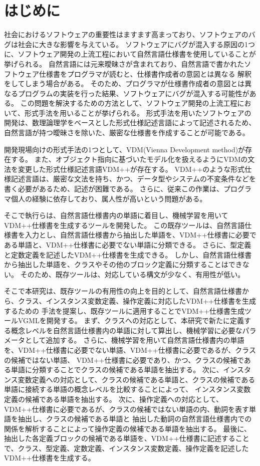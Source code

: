 \chapter{はじめに}
\label{cha:Introduction}

社会におけるソフトウェアの重要性はますます高まっており、ソフトウェアのバグは社会に大きな影響を与えている\cite{}。
ソフトウェアにバグが混入する原因の1つに、ソフトウェア開発の上流工程において自然言語仕様書を使用していることが挙げられる。
自然言語には元来曖昧さが含まれており、自然言語で書かれたソフトウェア仕様書をプログラマが読むと、仕様書作成者の意図とは異なる
解釈をしてしまう場合がある。
そのため、プログラマが仕様書作成者の意図とは異なるプログラムの実装を行った結果、ソフトウェアにバグが混入する可能性がある。
この問題を解決するための方法として、ソフトウェア開発の上流工程において、形式手法を用いることが挙げられる。
形式手法を用いたソフトウェアの開発は、数理論理学をベースとした形式仕様記述言語によって記述されるため、
自然言語が持つ曖昧さを除いた、厳密な仕様書を作成することが可能である。

開発現場向けの形式手法の1つとして、VDM(Vienna Development method)\cite{}が存在する。
また、オブジェクト指向に基づいたモデル化を扱えるようにVDMの文法を変更した形式仕様記述言語VDM++が存在する。
VDM++のような形式仕様記述言語は、厳密な文法を持ち、かつ、データ型やシステムの不変条件などを書く必要があるため、記述が困難である。
さらに、従来この作業は、プログラマ個人の経験に依存しており、属人性が高いという問題がある。

そこで執行らは、自然言語仕様書内の単語に着目し、機械学習を用いてVDM++仕様書を生成するツールを開発した\cite{}。
この既存ツールは、自然言語仕様書を入力とし、自然言語仕様書から抽出した単語を、VDM++仕様書に必要である単語と、VDM++仕様書に必要でない単語に分類できる。
さらに、型定義と定数定義を記述したVDM++仕様書を生成できる。
しかし、自然言語仕様書から抽出した単語を、クラスやその他のブロック定義に分類することはできない。
そのため、既存ツールは、対応している構文が少なく、有用性が低い。

そこで本研究は、既存ツールの有用性の向上を目的として、自然言語仕様書から、クラス、インスタンス変数定義、操作定義に対応したVDM++仕様書を生成するための
手法を提案し、既存ツールに適用することでVDM++仕様書生成ツールVGMLを開発する。
まず、クラスへの対応として、本研究で新たに定義する概念レベルを自然言語仕様書内の単語に対して算出し、機械学習に必要なパラメータとして追加する。
さらに、機械学習を用いて自然言語仕様書内の単語を、VDM++仕様書に必要でない単語、VDM++仕様書に必要であるが、クラスの候補ではない単語、
VDM++仕様書に必要であり、かつ、クラスの候補である単語に分類することでクラスの候補である単語を抽出する。
次に、インスタンス変数定義への対応として、クラスの候補である単語と、クラスの候補である単語に接続する単語の概念レベルを比較することによって、
インスタンス変数定義の候補である単語を抽出する。
次に、操作定義への対応として、VDM++仕様書に必要であるが、クラスの候補ではない単語の内、動詞を表す単語を抽出し、クラスの候補である単語と
抽出した動詞の自然言語仕様書内での関係を解析することによって操作定義の候補である単語を抽出する。
最後に、抽出した各定義ブロックの候補である単語を、VDM++仕様書に記述することで、クラス、型定義、定数定義、インスタンス変数定義、操作定義を記述した
VDM++仕様書を生成する。


